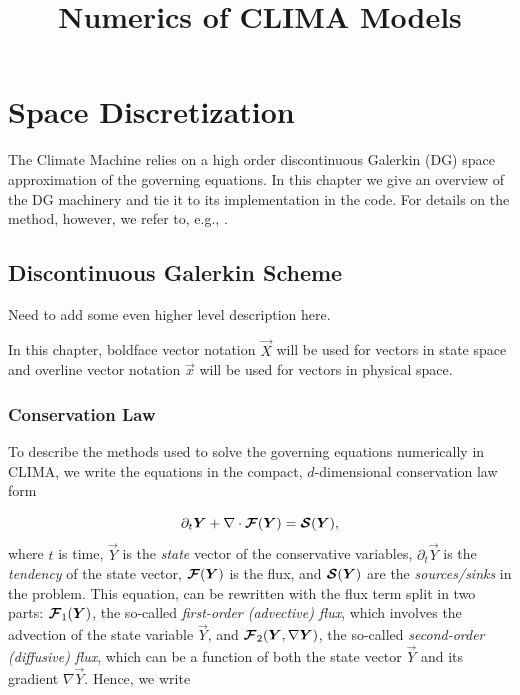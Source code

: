 \documentclass{report}
\title{Numerics of CLIMA Models}
\numberwithin{equation}{section}
\begin{document}
\maketitle
\tableofcontents

\chapter{Space Discretization}
The Climate Machine relies on a high order discontinuous Galerkin (DG) space approximation of the governing equations. 
In this chapter we give an overview of the DG machinery and tie it to its implementation in the code. For details on the method, however, we refer to, e.g., \cite{bassi:1997ee, hesthaven:2008}.


\section{Discontinuous Galerkin Scheme}

Need to add some even higher level description here.

In this chapter, boldface vector notation $\vec X$ will be used for vectors in state space and overline vector notation $\vec x$ will be used for vectors in physical space. 

\subsection{Conservation Law}

To describe the methods used to solve the governing equations numerically in CLIMA, we write the equations in the compact, $d$-dimensional conservation law form 

\begin{equation}\label{eq:aconservation_law}
    \partial_t \boldsymbol{{Y}} 
    + \nabla \cdot \boldsymbol{{\mathcal{F}}}(\boldsymbol{{Y}}) 
    = \boldsymbol{{\mathcal{S}}}(\boldsymbol{{Y}}),
\end{equation}
where $t$ is time, $\vec Y$ is the \emph{state} vector of the conservative variables, $\partial_t \vec{Y}$ is the \emph{tendency} of the state vector, $\boldsymbol{{\mathcal{F}}} (\boldsymbol{{Y}})$ is the flux, and $\boldsymbol{{\mathcal{S}}}(\boldsymbol{{Y}})$ are the \emph{sources/sinks} in the problem. This equation, can be rewritten with the flux term split in two parts:  $\boldsymbol{{\mathcal{F}}}_1 (\boldsymbol{{Y}})$, the so-called \emph{first-order (advective) flux}, which involves the advection of the state variable $\vec Y$, and $\boldsymbol{{\mathcal{F}}}_2 (\boldsymbol{{Y}}, \nabla \boldsymbol{{Y}})$, the so-called \emph{second-order (diffusive) flux}, which can be a function of both the state vector $\vec Y$ and its gradient $\nabla \vec Y$. Hence, we write
\end{document}
